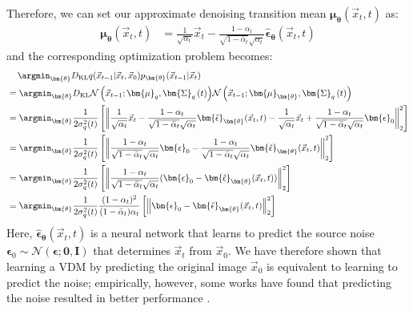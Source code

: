 Therefore, we can set our approximate denoising transition mean $\bm{\mu}_{\bm{\theta}}(\vec{x}_t, t)$ as:
\begin{align}
\bm{\mu}_{\bm{\theta}}(\vec{x}_t, t) &= \frac{1}{\sqrt{\alpha_t}}\vec{x}_t - \frac{1 - \alpha_t}{\sqrt{1 - \bar\alpha_t}\sqrt{\alpha_t}}\bm{\hat\epsilon}_{\bm{\theta}}(\vec{x}_t, t)
\end{align}
and the corresponding optimization problem becomes:
\begin{align}
& \quad \,\argmin_{\bm{\theta}} D_{\rm{KL}}{q(\vec{x}_{t-1}|\vec{x}_t, \vec{x}_0)}{p_{\bm{\theta}}(\vec{x}_{t-1}|\vec{x}_t)} \nonumber \\
&= \argmin_{\bm{\theta}}D_{\rm{KL}}{\mathcal{N}\left(\vec{x}_{t-1}; \bm{\mu}_q,\bm{\Sigma}_q\left(t\right)\right)}{\mathcal{N}\left(\vec{x}_{t-1}; \bm{\mu}_{\bm{\theta}},\bm{\Sigma}_q\left(t\right)\right)}\\
&=\argmin_{\bm{\theta}}\frac{1}{2\sigma_q^2(t)}\left[\left\lVert\frac{1}{\sqrt{\alpha_t}}\vec{x}_t - \frac{1 - \alpha_t}{\sqrt{1 - \bar\alpha_t}\sqrt{\alpha_t}}\bm{\hat\epsilon}_{\bm{\theta}}(\vec{x}_t, t) - 
\frac{1}{\sqrt{\alpha_t}}\vec{x}_t + \frac{1 - \alpha_t}{\sqrt{1 - \bar\alpha_t}\sqrt{\alpha_t}}\bm{\epsilon}_0\right\rVert_2^2\right]\\
&=\argmin_{\bm{\theta}}\frac{1}{2\sigma_q^2(t)}\left[\left\lVert \frac{1 - \alpha_t}{\sqrt{1 - \bar\alpha_t}\sqrt{\alpha_t}}\bm{\epsilon}_0 - \frac{1 - \alpha_t}{\sqrt{1 - \bar\alpha_t}\sqrt{\alpha_t}}\bm{\hat\epsilon}_{\bm{\theta}}(\vec{x}_t, t)\right\rVert_2^2\right]\\
&=\argmin_{\bm{\theta}}\frac{1}{2\sigma_q^2(t)}\left[\left\lVert \frac{1 - \alpha_t}{\sqrt{1 - \bar\alpha_t}\sqrt{\alpha_t}}(\bm{\epsilon}_0 - \bm{\hat\epsilon}_{\bm{\theta}}(\vec{x}_t, t))\right\rVert_2^2\right]\\
&=\argmin_{\bm{\theta}}\frac{1}{2\sigma_q^2(t)}\frac{(1 - \alpha_t)^2}{(1 - \bar\alpha_t)\alpha_t}\left[\left\lVert\bm{\epsilon}_0 - \bm{\hat\epsilon}_{\bm{\theta}}(\vec{x}_t, t)\right\rVert_2^2\right]
\end{align}
\endgroup
Here, $\bm{\hat\epsilon}_{\bm{\theta}}(\vec{x}_t, t)$ is a neural network that learns to predict the source noise $\bm{\epsilon}_0 \sim \mathcal{N}(\bm{\epsilon}; \bm{0}, \textbf{I})$ that determines $\vec{x}_t$ from $\vec{x}_0$.  We have therefore shown that learning a VDM by predicting the original image $\vec{x}_0$ is equivalent to learning to predict the noise; empirically, however, some works have found that predicting the noise resulted in better performance \cite{ho2020denoising, saharia2022photorealistic}.

